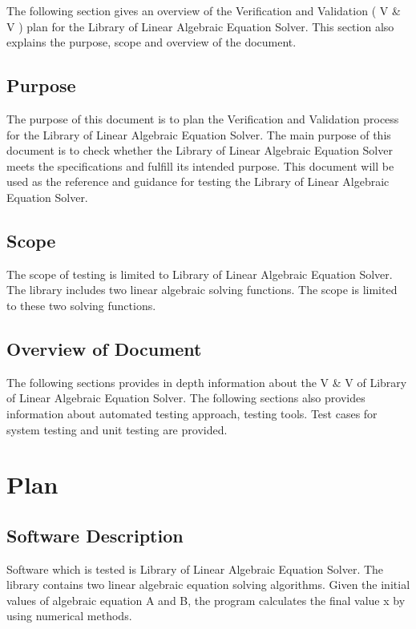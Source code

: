\documentclass[12pt, titlepage]{article}
\begin{document}
The following section gives an overview of the Verification and Validation ( V
\& V ) plan for the Library of Linear Algebraic Equation Solver. This section
also explains the purpose, scope and overview of the document.

\subsection{Purpose}

The purpose of this document is to plan the Verification and Validation process
for the Library of Linear Algebraic Equation Solver. The main purpose of this
document is to check whether the Library of Linear Algebraic Equation Solver
meets the specifications and fulfill its intended purpose. This document will be
used as the reference and guidance for testing the Library of Linear Algebraic
Equation Solver.




\subsection{Scope}

The scope of testing is limited to Library of Linear Algebraic Equation Solver.
The library includes two linear algebraic solving functions. The scope is
limited to these two solving functions.


\subsection{Overview of Document}

The following sections provides in depth information about the V \& V of Library
of Linear Algebraic Equation Solver. The following sections also provides
information about automated testing approach, testing tools. Test cases for
system testing and unit testing are provided.

\section{Plan}
	
\subsection{Software Description}

Software which is tested is Library of Linear Algebraic Equation Solver. The
library contains two linear algebraic equation solving algorithms. Given the
initial values of algebraic equation A and B, the program calculates the final
value x by using numerical methods.
\end{document}
